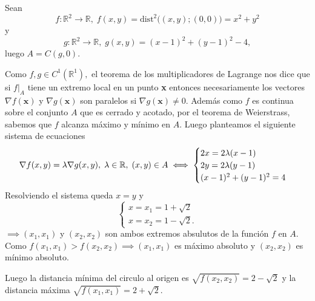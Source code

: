 \begin{solution}
    Sean 
    \[
    f: \mathbb{R}^2 \rightarrow \mathbb{R}, \; f(x,y) = \text{dist}^2\Big((x,y);(0,0)\Big)  = x^2 + y^2 
    \]
    y 
    \[
    g: \mathbb{R}^2 \rightarrow \mathbb{R}, \; g(x,y) = (x-1)^2 + (y-1)^2 - 4,
    \]
  luego $A=C(g,0) $.  
  
Como $f,g \in C^1( \mathbb{R}^1),$  el teorema de los multiplicadores de Lagrange nos dice que si $f \big\rvert _A$ tiene un extremo local en un punto \textbf{x} entonces necesariamente los vectores $\nabla f(\textbf{x})$ y $\nabla g(\textbf{x})$ son paralelos si $\nabla g(\textbf{x}) \neq 0$.   Además como $f$ es continua sobre el conjunto $A$ que es cerrado y acotado, por el teorema de Weierstrass, sabemos que $f$ alcanza m\'aximo y m\'inimo en $A$. Luego planteamos el siguiente sistema de ecuaciones
    \[
        \nabla f(x,y) = \lambda \nabla g(x,y), \; \lambda \in \mathbb{R}, \; (x,y) \in A \\
        \iff \begin{cases}
            2x = 2\lambda(x-1)\\
            2y = 2\lambda(y-1) \\
            (x-1)^2 + (y-1)^2 = 4
        \end{cases}
    \]
    Resolviendo el sistema queda $x=y$  \;  y \[ \begin{cases}
     x=   x_1=1+\sqrt{2}\\
      x=  x_2=1-\sqrt{2}.
    \end{cases}\]
    $\implies (x_1,x_1)$  y $(x_2,x_2)$  son ambos extremos absulutos de la función $f$  en $A$. Como $f(x_1,x_1) > f(x_2,x_2) \implies (x_1,x_1)$ es máximo absoluto y $(x_2,x_2)$ es mínimo absoluto.
    
Luego  la distancia mínima del circulo al origen es $\sqrt{f(x_2,x_2)} = 2-\sqrt{2} $ y la distancia máxima $\sqrt{f(x_1,x_1)} = 2+\sqrt{2}$. 
\end{solution}

